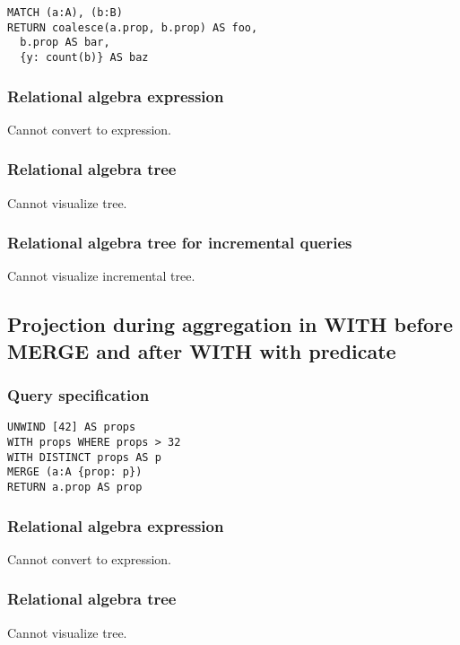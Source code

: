 \begin{lstlisting}
MATCH (a:A), (b:B)
RETURN coalesce(a.prop, b.prop) AS foo,
  b.prop AS bar,
  {y: count(b)} AS baz
\end{lstlisting}

\subsubsection*{Relational algebra expression}

Cannot convert to expression.

\subsubsection*{Relational algebra tree}

Cannot visualize tree.

\subsubsection*{Relational algebra tree for incremental queries}

Cannot visualize incremental tree.

\subsection{Projection during aggregation in WITH before MERGE and after WITH with predicate}

\subsubsection*{Query specification}

\begin{lstlisting}
UNWIND [42] AS props
WITH props WHERE props > 32
WITH DISTINCT props AS p
MERGE (a:A {prop: p})
RETURN a.prop AS prop
\end{lstlisting}

\subsubsection*{Relational algebra expression}

Cannot convert to expression.

\subsubsection*{Relational algebra tree}

Cannot visualize tree.

